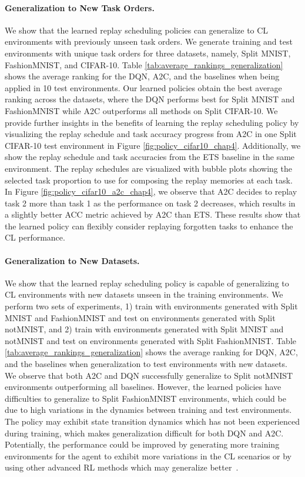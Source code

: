 \paragraph{Generalization to New Task Orders.} 
We show that the learned replay scheduling policies can generalize to CL environments with previously unseen task orders. We generate training and test environments with unique task orders for three datasets, namely, Split MNIST, FashionMNIST, and CIFAR-10. Table \ref{tab:average_rankings_generalization} shows the average ranking for the DQN, A2C, and the baselines when being applied in 10 test environments. 
Our learned policies obtain the best average ranking across the datasets, where the DQN performs best for Split MNIST and FashionMNIST while A2C outperforms all methods on Split CIFAR-10. 
We provide further insights in the benefits of learning the replay scheduling policy by visualizing the replay schedule and task accuracy progress from A2C in one Split CIFAR-10 test environment in Figure \ref{fig:policy_cifar10_chap4}. Additionally, we show the replay schedule and task accuracies from the ETS baseline in the same environment. The replay schedules are visualized with bubble plots showing the selected task proportion to use for composing the replay memories at each task. In Figure \ref{fig:policy_cifar10_a2c_chap4}, we observe that A2C decides to replay task 2 more than task 1 as the performance on task 2 decreases, which results in a slightly better ACC metric achieved by A2C than ETS. These results show that the learned policy can flexibly consider replaying forgotten tasks to enhance the CL performance.


\vspace{-3mm}
\paragraph{Generalization to New Datasets.}
We show that the learned replay scheduling policy is capable of generalizing to CL environments with new datasets unseen in the training environments. We perform two sets of experiments, 1) train with environments generated with Split MNIST and FashionMNIST and test on environments generated with Split notMNIST, and 2) train with environments generated with Split MNIST and notMNIST and test on environments generated with Split FashionMNIST.
Table \ref{tab:average_rankings_generalization} shows the average ranking for DQN, A2C, and the baselines when generalization to test environments with new datasets. We observe that both A2C and DQN successfully generalize to Split notMNIST environments outperforming all baselines. However, the learned policies have difficulties to generalize to Split FashionMNIST environments, which could be due to high variations in the dynamics between training and test environments. 
The policy may exhibit state transition dynamics which has not been experienced during training, which makes generalization difficult for both DQN and A2C.
Potentially, the performance could be improved by generating more training environments for the agent to exhibit more variations in the CL scenarios or by using other advanced RL methods which may generalize better~\cite{igl2019generalization}.

